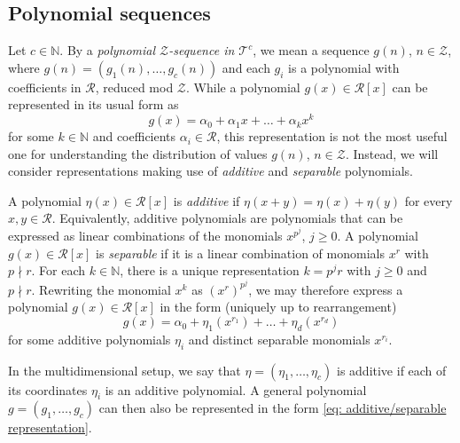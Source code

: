 \documentclass[11pt]{amsart}
\theoremstyle{theorem}
\theoremstyle{definition}
\newcommand{\N}{\mathbb{N}}
\newcommand{\mZ}{\mathcal{Z}}
\newcommand{\mR}{\mathcal{R}}
\newcommand{\mT}{\mathcal{T}}
\begin{document}

\subsection{Polynomial sequences} \label{sec: polynomial sequences}

Let $c \in \N$.
By a \emph{polynomial $\mZ$-sequence in $\mT^c$}, we mean a sequence $g(n)$, $n \in \mZ$, where $g(n) = (g_1(n), \ldots, g_c(n))$ and each $g_i$ is a polynomial with coefficients in $\mR$, reduced mod $\mZ$.
While a polynomial $g(x) \in \mR[x]$ can be represented in its usual form as
\begin{equation} \label{eq: standard representation}
	g(x) = \alpha_0 + \alpha_1 x + \ldots + \alpha_k x^k
\end{equation}
for some $k \in \N$ and coefficients $\alpha_i \in \mR$, this representation is not the most useful one for understanding the distribution of values $g(n)$, $n \in \mZ$.
Instead, we will consider representations making use of \emph{additive} and \emph{separable} polynomials.

A polynomial $\eta(x) \in \mR[x]$ is \emph{additive} if $\eta(x+y) = \eta(x) + \eta(y)$ for every $x,y \in \mR$.
Equivalently, additive polynomials are polynomials that can be expressed as linear combinations of the monomials $x^{p^j}$, $j \ge 0$.
A polynomial $g(x) \in \mR[x]$ is \emph{separable} if it is a linear combination of monomials $x^r$ with $p \nmid r$.
For each $k \in \N$, there is a unique representation $k = p^j r$ with $j \ge 0$ and $p \nmid r$.
Rewriting the monomial $x^k$ as $(x^r)^{p^j}$, we may therefore express a polynomial $g(x) \in \mR[x]$ in the form (uniquely up to rearrangement)
\begin{equation} \label{eq: additive/separable representation}
	g(x) = \alpha_0 + \eta_1(x^{r_1}) + \ldots + \eta_d(x^{r_d})
\end{equation}
for some additive polynomials $\eta_i$ and distinct separable monomials $x^{r_i}$.

In the multidimensional setup, we say that $\eta = (\eta_1, \ldots, \eta_c)$ is additive if each of its coordinates $\eta_i$ is an additive polynomial.
A general polynomial $g = (g_1, \ldots, g_c)$ can then also be represented in the form \eqref{eq: additive/separable representation}.
\end{document}
